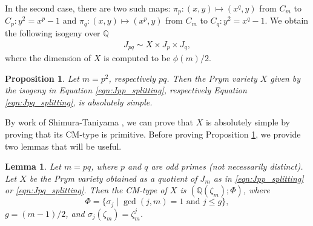 \documentclass[reqno, oneside, 12pt]{amsart}
\newcommand{\Q}{\mathbb{Q}}
\newtheorem{proposition}[theorem]{Proposition}
\newtheorem{lemma}[theorem]{Lemma}
\theoremstyle{remark}
\numberwithin{equation}{section}
\begin{document}
In the second case, there are two such maps:
 $\pi_p\colon (x,y)\mapsto (x^{q},y)$ from $C_m$ to $C_p:y^2=x^p-1$ and $\pi_q\colon (x,y)\mapsto (x^{p},y)$ from $C_m$ to $C_q:y^2=x^q-1$. We obtain the following isogeny over $\Q$
\begin{align}\label{eqn:Jpq_splitting}
    J_{pq}\sim X\times J_p \times J_q,
\end{align}
where the dimension of $X$ is computed to be $\phi(m)/2$.


\begin{proposition}\label{prop:X_simple_CMtype}
Let $m=p^2$, respectively $pq$. Then the Prym variety $X$ given by the isogeny in Equation \eqref{eqn:Jpp_splitting}, respectively Equation \eqref{eqn:Jpq_splitting}, is absolutely simple. 
\end{proposition}

By work of Shimura-Taniyama \cite{ShimuraTaniyama1961}, we can prove that $X$ is absolutely simple by proving that its CM-type is primitive. Before proving Proposition \ref{prop:X_simple_CMtype}, we provide two lemmas that will be useful.

\begin{lemma}\label{lemma:CMtype}
Let $m=pq$, where $p$ and $q$ are odd primes (not necessarily distinct). Let $X$ be the Prym variety obtained as a quotient of $J_m$ as in \eqref{eqn:Jpp_splitting} or \eqref{eqn:Jpq_splitting}. Then the CM-type of $X$ is $(\Q(\zeta_m); \Phi)$, where
$$\Phi=\{\sigma_j \mid \gcd(j,m)=1\text{ and } j\leq g\},$$ 
$g=(m-1)/2$, and $\sigma_j(\zeta_m)=\zeta_m^j$.
\end{lemma}
\end{document}
